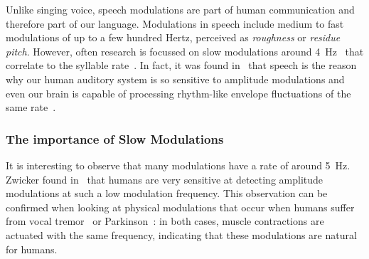 Unlike singing voice, speech modulations are part of human communication and therefore part of our language.
Modulations in speech include medium to fast modulations of up to a few hundred Hertz, perceived as \emph{roughness} or \emph{residue pitch}.
However, often research is focussed on slow modulations around 4~\si{\hertz}~\cite{greenberg97, fuellgrabe09} that correlate to the syllable rate~\cite{plomp83, houtgast85}.
In fact, it was found in~\cite{joris04} that speech is the reason why our human auditory system is so sensitive to amplitude modulations and even our brain is capable of processing rhythm-like envelope fluctuations of the same rate~\cite{schreiner88, plomp83}.

\subsubsection*{The importance of Slow Modulations}

It is interesting to observe that many modulations have a rate of around 5~\si{\hertz}. 
Zwicker found in~\cite{zwicker52} that humans are very sensitive at detecting amplitude modulations at such a low modulation frequency.
This observation can be confirmed when looking at physical modulations that occur when humans suffer from vocal tremor~\cite{ramig87} or Parkinson~\cite{botzel14}: in both cases, muscle contractions are actuated with the same frequency, indicating that these modulations are natural for humans.

